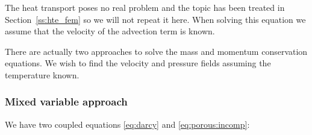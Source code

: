 The heat transport poses no real problem and the topic has been treated in 
Section~\ref{ss:hte_fem} so we will not repeat it here. When solving this equation we assume that the velocity of the advection term is known.

There are actually two approaches to solve the mass and momentum conservation equations.
We wish to find the velocity and pressure fields assuming the temperature known. 

\subsubsection{Mixed variable approach}

We have two coupled equations \eqref{eq:darcy} and \eqref{eq:porous:incomp}:

